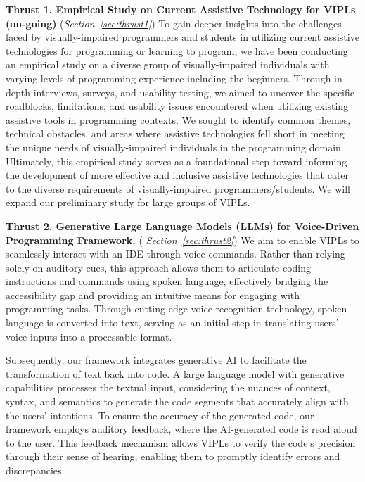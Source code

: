 \vspace{3pt}
\noindent \textbf{Thrust 1. Empirical Study on Current Assistive
  Technology for VIPLs (on-going)} ({\em Section~\ref{sec:thrust1}})
To gain deeper insights into the challenges faced by visually-impaired
programmers and students in utilizing current assistive technologies
for programming or learning to program, we have been conducting an
empirical study on a diverse group of visually-impaired individuals
with varying levels of programming experience including the
beginners. Through in-depth interviews, surveys, and usability
testing, we aimed to uncover the specific roadblocks, limitations, and
usability issues encountered when utilizing existing assistive tools
in programming contexts.
We sought to identify common themes, technical obstacles, and areas
where assistive technologies fell short in meeting the unique needs of
visually-impaired individuals in the programming domain. Ultimately,
this empirical study serves as a foundational step toward informing
the development of more effective and inclusive assistive technologies
that cater to the diverse requirements of visually-impaired
programmers/students. We will expand our preliminary study
for large groups of VIPLs.

\noindent \textbf{Thrust 2. Generative Large Language Models (LLMs)
  for Voice-Driven Programming Framework.}  ({\em
  Section~\ref{sec:thrust2}})
We aim to enable VIPLs to seamlessly interact with an IDE through
voice commands. Rather than relying solely on auditory cues, this
approach allows them to articulate coding instructions and commands
using spoken language, effectively bridging the accessibility gap and
providing an intuitive means for engaging with programming
tasks. Through cutting-edge voice recognition technology, spoken
language is converted into text, serving as an initial step in
translating users' voice inputs into a processable format.

Subsequently, our framework integrates generative AI to facilitate the
transformation of text back into code. A large language model with
generative capabilities processes the textual input, considering the
nuances of context, syntax, and semantics to generate the
code segments that accurately align with the users' intentions. To
ensure the accuracy of the generated code, our framework employs
auditory feedback, where the AI-generated code is read aloud to the
user. This feedback mechanism allows VIPLs to verify the code's
precision through their sense of hearing, enabling them to promptly
identify errors and discrepancies.

